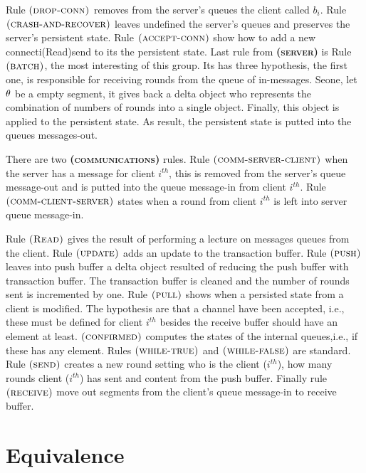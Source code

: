 \documentclass[envcountsect,runningheads,orivec]{llncs}
\begin{document}
Rule $\textsc{(drop-conn)}$ removes from the server's queues the client called $b_i$. Rule $\textsc{(crash-and-recover)}$ leaves undefined the server's queues and preserves the server's persistent state.  Rule $\textsc{(accept-conn)}$ show how to add a new connecti(Read)send to its the persistent state. Last rule from \textbf{\textsc{(server)}} is Rule $\textsc{(batch)}$, the most interesting of this group. Its has three hypothesis, the first one, is responsible for receiving rounds from the queue of in-messages. Se\cond one, let $\theta$ be a empty segment, it gives back a delta object who represents the combination of numbers of rounds into a single object. Finally, this object is applied to the persistent state. As result, the persistent state is putted into the queues messages-out.

There are two \textbf{\textsc{(communications)}} rules. Rule $\textsc{(comm-server-client)}$ when the server has a message for client $i^{th}$, this is removed from the server's queue message-out and is putted into the queue message-in from client $i^{th}$. Rule $\textsc{(comm-client-server)}$ states when a round from client $i^{th}$ is left into server queue message-in.

Rule $\textsc{(Read)}$ gives the result of performing a lecture on messages queues from the client. Rule $\textsc{(update)}$ adds an update to the transaction buffer. Rule $\textsc{(push)}$ leaves into push buffer a delta object resulted of reducing the push buffer with transaction buffer. The transaction buffer is cleaned and the number of rounds sent is incremented by one. Rule $\textsc{(pull)}$ shows when a persisted state from a client is modified. The hypothesis are that a channel have been accepted, i.e., these must be defined for client $i^{th}$ besides the receive buffer should have an element at least. $\textsc{(confirmed)}$
computes the states of the internal queues,i.e., if these has any element. Rules $\textsc{(while-true)}$ and $\textsc{(while-false)}$ are standard. Rule $\textsc{(send)}$ creates a new round setting who is the client ($i^{th}$), how many rounds client ($i^{th}$) has sent and content from the push buffer. Finally rule $\textsc{(receive)}$ move out segments from the client's queue message-in to receive buffer.

\section{Equivalence}
\end{document}
